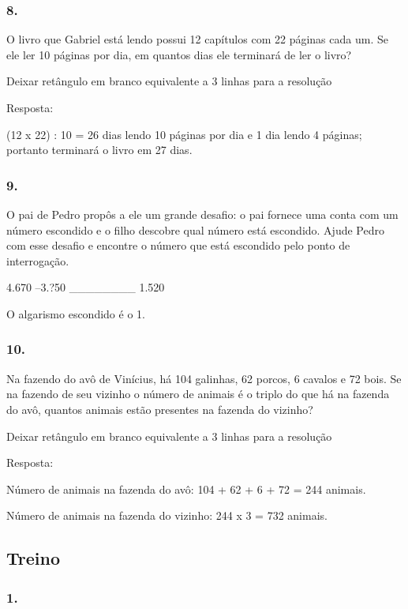 \begin{enumerate}
\begin{escolha}
\subsubsection{8.}\label{section-20}

O livro que Gabriel está lendo possui 12 capítulos com 22 páginas cada
um. Se ele ler 10 páginas por dia, em quantos dias ele terminará de ler
o livro?

Deixar retângulo em branco equivalente a 3 linhas para a resolução

Resposta:

(12 x 22) : 10 = 26 dias lendo 10 páginas por dia e 1 dia lendo 4 páginas; portanto terminará o livro em 27 dias.

\subsubsection{9.}\label{section-21}

O pai de Pedro propôs a ele um grande desafio:
o pai fornece uma conta com um número escondido e o filho 
descobre qual número está escondido. Ajude Pedro com esse desafio e
encontre o número que está escondido pelo ponto de interrogação.

  4.670
--3.?50
________
  1.520

O algarismo escondido é o 1.

\subsubsection{10.}\label{section-22}

Na fazendo do avô de Vinícius, há 104 galinhas, 62 porcos, 6 cavalos e 72
bois. Se na fazendo de seu vizinho o número de animais é o triplo do que
há na fazenda do avô, quantos animais estão presentes na fazenda do
vizinho?

Deixar retângulo em branco equivalente a 3 linhas para a resolução

Resposta:

Número de animais na fazenda do avô: 104 + 62 + 6 + 72 = 244 animais.

Número de animais na fazenda do vizinho: 244 x 3 = 732 animais.

\subsection{Treino}\label{treino-1}

\subsubsection{1.}\label{section-23}


\end{escolha}
\end{enumerate}
